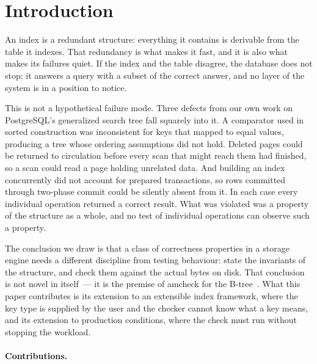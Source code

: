 \section{Introduction}

An index is a redundant structure: everything it contains is derivable from the
table it indexes. That redundancy is what makes it fast, and it is also what
makes its failures quiet. If the index and the table disagree, the database does
not stop; it answers a query with a subset of the correct answer, and no layer of
the system is in a position to notice.

This is not a hypothetical failure mode. Three defects from our own work on
PostgreSQL's generalized search tree fall squarely into it. A comparator used in
sorted construction was inconsistent for keys that mapped to equal values,
producing a tree whose ordering assumptions did not hold. Deleted pages could be
returned to circulation before every scan that might reach them had finished, so
a scan could read a page holding unrelated data. And building an index
concurrently did not account for prepared transactions, so rows committed through
two-phase commit could be silently absent from it. In each case every individual
operation returned a correct result. What was violated was a property of the
structure as a whole, and no test of individual operations can observe such a
property.

The conclusion we draw is that a class of correctness properties in a storage
engine needs a different discipline from testing behaviour: state the invariants
of the structure, and check them against the actual bytes on disk. That
conclusion is not novel in itself~--- it is the premise of amcheck for the
B-tree~\cite{thread-amcheck-btree}. What this paper contributes is its extension
to an extensible index framework, where the key type is supplied by the user and
the checker cannot know what a key means, and its extension to production
conditions, where the check must run without stopping the workload.

\paragraph{Contributions.}

